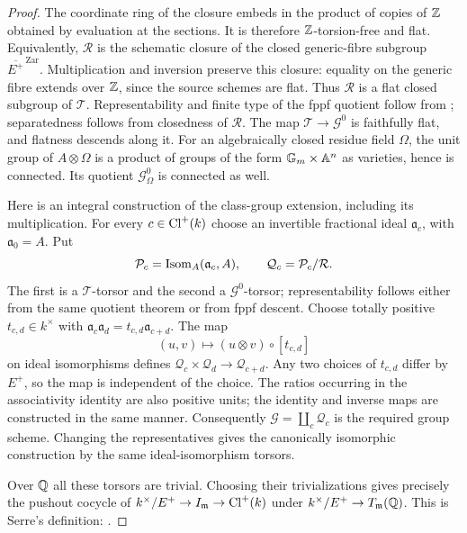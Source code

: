 \begin{proof}
The coordinate ring of the closure embeds in the product of copies of
$\mathbb Z$ obtained by evaluation at the sections.  It is therefore
$\mathbb Z$-torsion-free and flat.  Equivalently, $\mathcal R$ is the schematic
closure of the closed generic-fibre subgroup
$\overline{E^+}^{\,\mathrm{Zar}}$.  Multiplication and inversion preserve
this closure: equality on the generic fibre extends over $\mathbb Z$, since the
source schemes are flat.  Thus $\mathcal R$ is a flat closed subgroup of
$\mathcal T$.  Representability and finite type of the fppf quotient follow
from \citet[Theorem 4.C, p.~53]{DAnantharaman1973}; separatedness follows
from closedness of $\mathcal R$.  The map $\mathcal T\to\mathcal G^0$ is
faithfully flat, and flatness descends along it.  For an algebraically closed
residue field $\Omega$, the unit group of $A\otimes\Omega$ is a product
of groups of the form ${\mathbb G_m}\times\mathbb A^n$ as varieties, hence is
connected.  Its quotient $\mathcal G^0_\Omega$ is connected as well.

Here is an integral construction of the class-group extension, including
its multiplication.  For every $c\in\operatorname{Cl}^+(k)$ choose an invertible
fractional ideal $\mathfrak a_c$, with $\mathfrak a_0=A$.  Put
\[
 \mathcal P_c=\operatorname{Isom}_{A}(\mathfrak a_c,A),\qquad
 \mathcal Q_c=\mathcal P_c/\mathcal R.
\]
The first is a $\mathcal T$-torsor and the second a
$\mathcal G^0$-torsor; representability follows either from the same
quotient theorem or from fppf descent.  Choose totally positive
$t_{c,d}\in k^\times$ with
$\mathfrak a_c\mathfrak a_d=t_{c,d}\mathfrak a_{c+d}$.  The map
\[
 (u,v)\longmapsto (u\otimes v)\circ[t_{c,d}]
\]
on ideal isomorphisms defines
$\mathcal Q_c\times\mathcal Q_d\to\mathcal Q_{c+d}$.  Any two choices
of $t_{c,d}$ differ by $E^+$, so the map is independent of the choice.
The ratios occurring in the associativity identity are also positive
units; the identity and inverse maps are constructed in the same manner.
Consequently $\mathcal G=\coprod_c\mathcal Q_c$ is the required group
scheme.  Changing the representatives gives the canonically isomorphic
construction by the same ideal-isomorphism torsors.

Over $\mathbb Q$ all these torsors are trivial.  Choosing their trivializations
gives precisely the pushout cocycle of
$k^\times/E^+\to I_{\mathfrak m}\to\operatorname{Cl}^+(k)$ under
$k^\times/E^+\to T_{\mathfrak m}(\mathbb Q)$.  This is Serre's definition:
\citet[Chapter II, \S1.3 and \S2.2, pp.~II-3--II-9]{DSerre1968}.
\end{proof}

